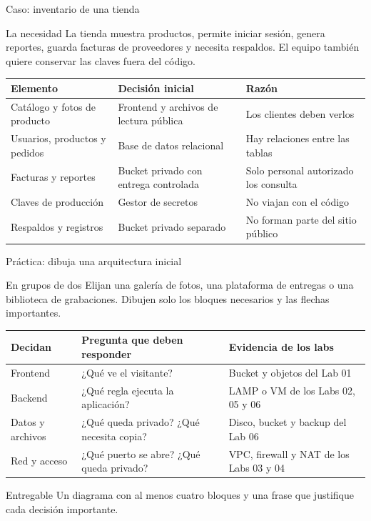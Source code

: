 \documentclass[aspectratio=169,10pt,c]{beamer}
\begin{document}
\begin{frame}{Caso: inventario de una tienda}
\begin{block}{La necesidad}
\small La tienda muestra productos, permite iniciar sesión, genera reportes, guarda facturas de proveedores y necesita respaldos. El equipo también quiere conservar las claves fuera del código.
\end{block}
\renewcommand{\arraystretch}{1.26}
\centering\small
\begin{tabular}{@{}p{4.0cm}p{5.2cm}p{3.3cm}@{}}
\toprule
\textbf{Elemento} & \textbf{Decisión inicial} & \textbf{Razón}\\
\midrule
Catálogo y fotos de producto & Frontend y archivos de lectura pública & Los clientes deben verlos\\
Usuarios, productos y pedidos & Base de datos relacional & Hay relaciones entre las tablas\\
Facturas y reportes & Bucket privado con entrega controlada & Solo personal autorizado los consulta\\
Claves de producción & Gestor de secretos & No viajan con el código\\
Respaldos y registros & Bucket privado separado & No forman parte del sitio público\\
\bottomrule
\end{tabular}
\end{frame}

\begin{frame}{Práctica: dibuja una arquitectura inicial}
\begin{block}{En grupos de dos}
\small Elijan una galería de fotos, una plataforma de entregas o una biblioteca de grabaciones. Dibujen solo los bloques necesarios y las flechas importantes.
\end{block}
\renewcommand{\arraystretch}{1.15}
\centering\small
\begin{tabular}{@{}p{2.8cm}p{6.2cm}p{3.2cm}@{}}
\toprule
\textbf{Decidan} & \textbf{Pregunta que deben responder} & \textbf{Evidencia de los labs}\\
\midrule
Frontend & ¿Qué ve el visitante? & Bucket y objetos del Lab 01\\
Backend & ¿Qué regla ejecuta la aplicación? & LAMP o VM de los Labs 02, 05 y 06\\
Datos y archivos & ¿Qué queda privado? ¿Qué necesita copia? & Disco, bucket y backup del Lab 06\\
Red y acceso & ¿Qué puerto se abre? ¿Qué queda privado? & VPC, firewall y NAT de los Labs 03 y 04\\
\bottomrule
\end{tabular}
\par\vspace{0.5mm}
\begin{alertblock}{Entregable}
\small Un diagrama con al menos cuatro bloques y una frase que justifique cada decisión importante.
\end{alertblock}
\end{frame}
\end{document}
